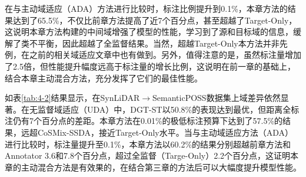     在与主动域适应（ADA）方法进行比较时，标注比例提升到0.1\%，本章方法的结果达到了65.5\%，不仅比前章方法提高了近7个百分点，甚至超越了Target-Only，这说明本章方法构建的中间域增强了模型的性能，学习到了源和目标域的信息，缓解了类不平衡，因此超越了全监督结果。当然，超越Target-Only本方法并非先例，在之前的相关域适应文章中也有做到。另外，值得注意的是，虽然标注量增加了2.5倍，但性能提升幅度远高于标注量的增长比例，这说明在前一章的基础上，结合本章主动混合方法，充分发挥了它们的最佳性能。
    
    
    如表\ref{tab:4-2}结果显示，在SynLiDAR$\to$SemanticPOSS数据集上域差异依然显著。在无监督域适应（UDA）中，DGT-ST以50.8\%的表现达到最优，但距离全标注仍有7个百分点的差距。本章方法在0.01\%的极低标注预算下达到了57.5\%的结果，远超CoSMix-SSDA，接近Target-Only水平。当与主动域适应方法（ADA）进行比较时，标注量提升至0.1\%，本章方法以60.2\%的结果分别超越前章方法和Annotator 3.6和7.8个百分点，超过全监督（Targe-Only）2.2个百分点，这证明本章的主动混合方法是有效果的，在结合第三章的方法后可以大幅度提升模型性能。

